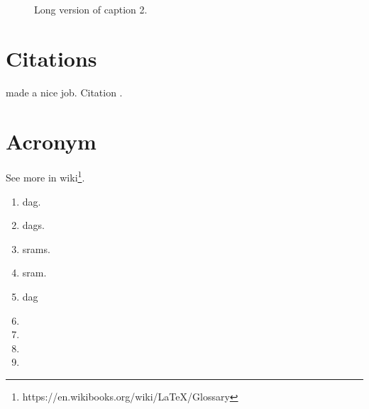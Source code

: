 \begin{figure}[th]
    
    
    \caption[Short Caption 2]{
        Long version of caption 2.
    }
\label{fig.logo}
\end{figure}

\section{Citations}
 made a nice job.
Citation \cite{Wiegand03}.

\section{Acronym}
See more in wiki\footnote{https://en.wikibooks.org/wiki/LaTeX/Glossary}.
\begin{enumerate}
    \item \gls{dag}.
    \item \glspl{dag}.
    \item \glspl{sram}.
    \item \gls{sram}.
    \item \acrfull{dag}
    \item {}
    \item \test
    \item \test
    \item \tests
\end{enumerate}


